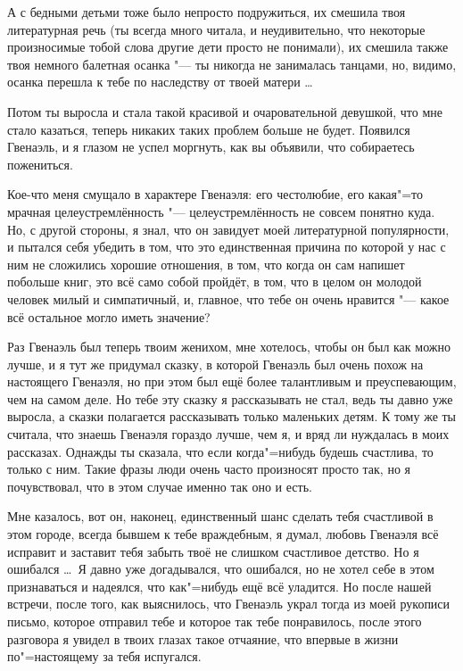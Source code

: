 А с бедными детьми тоже было непросто подружиться, их смешила твоя литературная
речь (ты всегда много читала, и неудивительно, что некоторые произносимые тобой
слова другие дети просто не понимали), их смешила также твоя немного балетная
осанка "--- ты никогда не занималась танцами, но, видимо, осанка перешла к тебе
по наследству от твоей матери \ldots

Потом ты выросла и стала такой красивой и очаровательной девушкой, что мне стало
казаться, теперь никаких таких проблем больше не будет.
Появился Гвенаэль, и я глазом не успел моргнуть, как вы объявили, что
собираетесь пожениться.

Кое-что меня смущало в характере Гвенаэля: его честолюбие, его какая"=то мрачная
целеустремлённость "--- целеустремлённость не совсем понятно куда.
Но, с другой стороны, я знал, что он завидует моей литературной популярности, и
пытался себя убедить в том, что это единственная причина по которой у нас с ним
не сложились хорошие отношения, в том, что когда он сам напишет побольше книг,
это всё само собой пройдёт, в том, что в целом он молодой человек милый и
симпатичный, и, главное, что тебе он очень нравится "--- какое всё остальное
могло иметь значение?

Раз Гвенаэль был теперь твоим женихом, мне хотелось, чтобы он был как можно
лучше, и я тут же придумал сказку, в которой Гвенаэль был очень похож на
настоящего Гвенаэля, но при этом был ещё более талантливым и преуспевающим, чем
на самом деле.
Но тебе эту сказку я рассказывать не стал, ведь ты давно уже выросла, а сказки
полагается рассказывать только маленьких детям.
К тому же ты считала, что знаешь Гвенаэля гораздо лучше, чем я, и вряд ли
нуждалась в моих рассказах. Однажды ты сказала, что если когда"=нибудь будешь
счастлива, то только с ним.
Такие фразы люди очень часто произносят просто так, но я почувствовал, что в
этом случае именно так оно и есть.

Мне казалось, вот он, наконец, единственный шанс сделать тебя счастливой в этом
городе, всегда бывшем к тебе враждебным, я думал, любовь Гвенаэля всё исправит и
заставит тебя забыть твоё не слишком счастливое детство.
Но я ошибался \ldots\
Я давно уже догадывался, что ошибался, но не хотел себе в этом признаваться и
надеялся, что как"=нибудь ещё всё уладится.
Но после нашей встречи, после того, как выяснилось, что Гвенаэль украл тогда из
моей рукописи письмо, которое отправил тебе и которое так тебе понравилось,
после этого разговора я увидел в твоих глазах такое отчаяние, что впервые в
жизни по"=настоящему за тебя испугался.

